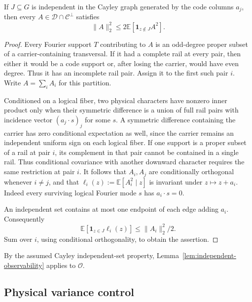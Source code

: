 \begin{lemma}\label{lem:independent-observability}
If $J\subseteq G$ is independent in the Cayley graph generated by the code columns $a_j$,
then every $A\in\mathcal D\cap\mathcal C^\perp$ satisfies
\[
 \|A\|_2^2\le2\mathbb E[\mathbf1_{z\notin J}A^2].
\]
\end{lemma}
\begin{proof}
Every Fourier support $T$ contributing to $A$ is an odd-degree proper
subset of a carrier-containing transversal. If it had a complete rail
at every pair, then either it would be a code support or, after losing
the carrier, would have even degree. Thus it has an incomplete rail
pair. Assign it to the first such pair $i$. Write $A=\sum_i A_i$ for this partition.

Conditioned on a logical fiber, two physical characters have nonzero
inner product only when their symmetric difference is a union of full
rail pairs with incidence vector $(a_j\cdot s)_j$ for some $s$. A symmetric difference containing the carrier has zero
conditional expectation as well, since the carrier remains an
independent uniform sign on each logical fiber. If one support is a proper subset of a rail at pair $i$,
its complement in that pair cannot be contained in a single rail.
Thus conditional covariance with another downward character requires
the same restriction at pair $i$. It follows that $A_i,A_j$ are
conditionally orthogonal whenever $i\ne j$, and that
$\ell_i(z):=\mathbb E[A_i^2\mid z]$ is invariant under $z\mapsto z+a_i$.
Indeed every surviving logical Fourier mode $s$ has $a_i\cdot s=0$.

An independent set contains at most one endpoint of each edge adding $a_i$.
Consequently
\[\mathbb E[\mathbf1_{z\in J}\ell_i(z)]\le\|A_i\|_2^2/2.\]
Sum over $i$, using conditional orthogonality, to obtain the assertion.
\end{proof}

By the assumed Cayley independent-set property,
Lemma~\ref{lem:independent-observability} applies to $\mathcal O$.

\subsection{Physical variance control}

